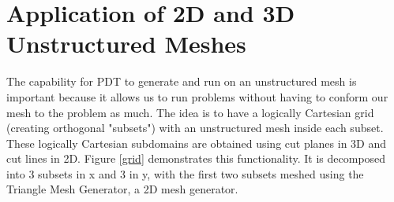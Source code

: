 \documentclass{anstrans}
\begin{document}
\section{Application of 2D and 3D Unstructured Meshes}
\label{ch:motivation}

The capability for PDT to generate and run on an unstructured mesh is important because it allows us to run problems without having to conform our mesh to the problem as much. The idea is to have a logically Cartesian grid (creating orthogonal "subsets") with an unstructured mesh inside each subset. These logically Cartesian subdomains are obtained using cut planes in 3D and cut lines in 2D. Figure \ref{grid} demonstrates this functionality. It is decomposed into 3 subsets in x and 3 in y, with the first two subsets meshed using the Triangle Mesh Generator\cite{triangle}, a 2D mesh generator.
\end{document}
